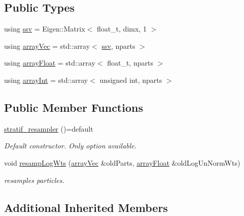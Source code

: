 \subsection*{Public Types}
\begin{DoxyCompactItemize}
\item 
using \hyperlink{classstratif__resampler_a9b8a1de85ef718528f4c889678a9331f}{ssv} = Eigen\+::\+Matrix$<$ float\+\_\+t, dimx, 1 $>$
\item 
using \hyperlink{classstratif__resampler_aafc4c3078fcc2912b41ad76465d86491}{array\+Vec} = std\+::array$<$ \hyperlink{classrbase_ae20e0b8df15aa109252f57ecbf1f20f8}{ssv}, nparts $>$
\item 
using \hyperlink{classstratif__resampler_ad85a57b7463ac619bb3123a2cd20bb01}{array\+Float} = std\+::array$<$ float\+\_\+t, nparts $>$
\item 
using \hyperlink{classstratif__resampler_a6feed5616bbd45f1bcf155fdf6348e19}{array\+Int} = std\+::array$<$ unsigned int, nparts $>$
\end{DoxyCompactItemize}
\subsection*{Public Member Functions}
\begin{DoxyCompactItemize}
\item 
\mbox{\label{classstratif__resampler_a76e8fbfaec214060f0644d5a076c2b2a}} 
\hyperlink{classstratif__resampler_a76e8fbfaec214060f0644d5a076c2b2a}{stratif\+\_\+resampler} ()=default
\begin{DoxyCompactList}\small\item\em Default constructor. Only option available. \end{DoxyCompactList}\item 
void \hyperlink{classstratif__resampler_a2588147563bf3fe598e262cae7e125e6}{resamp\+Log\+Wts} (\hyperlink{classrbase_aa12fc826befa6ba0647b5f59ebc396ee}{array\+Vec} \&old\+Parts, \hyperlink{classrbase_a6f76bef853e508cb5b6f546d231b06f5}{array\+Float} \&old\+Log\+Un\+Norm\+Wts)
\begin{DoxyCompactList}\small\item\em resamples particles. \end{DoxyCompactList}\end{DoxyCompactItemize}
\subsection*{Additional Inherited Members}


